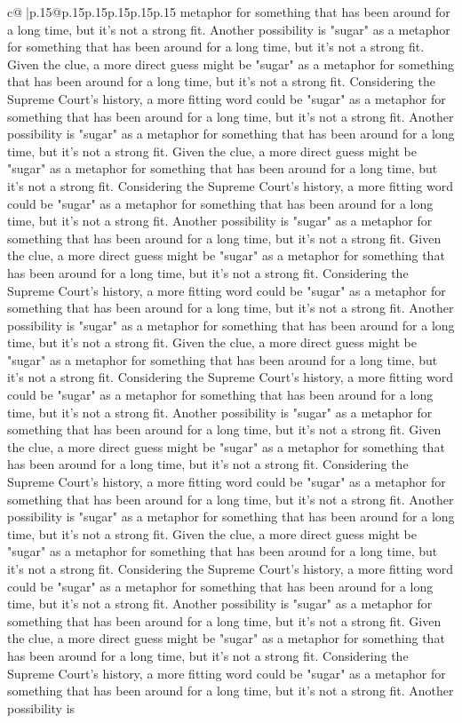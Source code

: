 \documentclass{article}
\begin{document}
{\begin{supertabular}{c@{$\;$}|p{.15\linewidth}@{}p{.15\linewidth}p{.15\linewidth}p{.15\linewidth}p{.15\linewidth}p{.15\linewidth}}
{{{metaphor for something that has been around for a long time, but it's not a strong fit. Another possibility is "sugar" as a metaphor for something that has been around for a long time, but it's not a strong fit. Given the clue, a more direct guess might be "sugar" as a metaphor for something that has been around for a long time, but it's not a strong fit. Considering the Supreme Court's history, a more fitting word could be "sugar" as a metaphor for something that has been around for a long time, but it's not a strong fit. Another possibility is "sugar" as a metaphor for something that has been around for a long time, but it's not a strong fit. Given the clue, a more direct guess might be "sugar" as a metaphor for something that has been around for a long time, but it's not a strong fit. Considering the Supreme Court's history, a more fitting word could be "sugar" as a metaphor for something that has been around for a long time, but it's not a strong fit. Another possibility is "sugar" as a metaphor for something that has been around for a long time, but it's not a strong fit. Given the clue, a more direct guess might be "sugar" as a metaphor for something that has been around for a long time, but it's not a strong fit. Considering the Supreme Court's history, a more fitting word could be "sugar" as a metaphor for something that has been around for a long time, but it's not a strong fit. Another possibility is "sugar" as a metaphor for something that has been around for a long time, but it's not a strong fit. Given the clue, a more direct guess might be "sugar" as a metaphor for something that has been around for a long time, but it's not a strong fit. Considering the Supreme Court's history, a more fitting word could be "sugar" as a metaphor for something that has been around for a long time, but it's not a strong fit. Another possibility is "sugar" as a metaphor for something that has been around for a long time, but it's not a strong fit. Given the clue, a more direct guess might be "sugar" as a metaphor for something that has been around for a long time, but it's not a strong fit. Considering the Supreme Court's history, a more fitting word could be "sugar" as a metaphor for something that has been around for a long time, but it's not a strong fit. Another possibility is "sugar" as a metaphor for something that has been around for a long time, but it's not a strong fit. Given the clue, a more direct guess might be "sugar" as a metaphor for something that has been around for a long time, but it's not a strong fit. Considering the Supreme Court's history, a more fitting word could be "sugar" as a metaphor for something that has been around for a long time, but it's not a strong fit. Another possibility is "sugar" as a metaphor for something that has been around for a long time, but it's not a strong fit. Given the clue, a more direct guess might be "sugar" as a metaphor for something that has been around for a long time, but it's not a strong fit. Considering the Supreme Court's history, a more fitting word could be "sugar" as a metaphor for something that has been around for a long time, but it's not a strong fit. Another possibility is }}}
\end{supertabular}}
\end{document}
